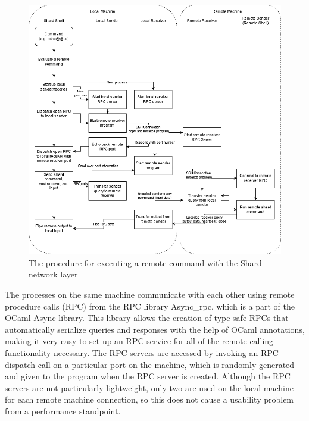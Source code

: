 \documentclass[twoside]{report}
\newcommand{\todoi}[1]{\todo[inline, color=blue!20]{TODO: {#1}}}
\begin{document}
\begin{figure}[h]
  \begin{center}
    \includegraphics[scale=0.5]{img/shard_protocol_impl.png}
    \caption{The procedure for executing a remote command with the Shard network layer}
    \label{fig:network_layer_impl}
  \end{center}
\end{figure}


The processes on the same machine communicate with each other using remote procedure calls (RPC) from the RPC library Async\_rpc, which is a part of the OCaml Async library.
This library allows the creation of type-safe RPCs that automatically serialize queries and responses with the help of OCaml annotations, making it very easy to set up an RPC service for all of the remote calling functionality necessary.
The RPC servers are accessed by invoking an RPC dispatch call on a particular port on the machine, which is randomly generated and given to the program when the RPC server is created.
Although the RPC servers are not particularly lightweight, only two are used on the local machine for each remote machine connection, so this does not cause a usability problem from a performance standpoint.
\end{document}
